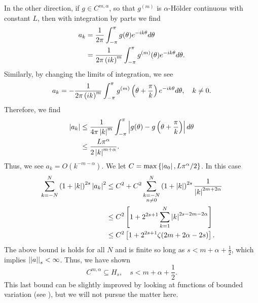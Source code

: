 In the other direction, if $g\in C^{m,\alpha}$, so that $g^{(m)}$
is $\alpha$-H\"{o}lder continuous with constant $L$, then
with integration by parts we find
%
\begin{align}
    a_{k} &= \frac{1}{2\pi}\int_{-\pi}^{\pi} g(\theta)e^{-ik\theta}d\theta
        \nonumber\\
    &= \frac{1}{2\pi\left( ik \right)^{m}}
        \int_{-\pi}^{\pi} g^{(m)}(\theta)e^{-ik\theta}d\theta.
\end{align}
%
Similarly, by changing the limits of integration, we see
%
\begin{equation}
    a_{k} = -\frac{1}{2\pi\left( ik \right)^{m}} \int_{-\pi}^{\pi}
        g^{(m)}\left( \theta+\frac{\pi}{k} \right)e^{-ik\theta}d\theta,
    \quad k\ne0.
\end{equation}
%
Therefore, we find
%
\begin{align}
    \left| a_{k} \right| &\le \frac{1}{4\pi\left| k \right|^{m}}\int_{-\pi}^{\pi}
        \left| g(\theta)-g\left( \theta+\frac{\pi}{k} \right) \right|d\theta \nonumber\\
    &\le \frac{L\pi^{\alpha}}{2\left| k \right|^{m+\alpha}}.
\end{align}
%
Thus, we see $a_{k} = O(k^{-m-\alpha})$.
We let $C = \max\left\{ \left| a_{0} \right|,L\pi^{\alpha}/2 \right\}$.
In this case
%
\begin{align}
    \sum_{k=-N}^{N} \left( 1+\left| k \right| \right)^{2s} \left| a_{k} \right|^{2}
        &\le C^{2} + C^{2}\sum_{\substack{k=-N\\n\ne0}}^{N}
            \left( 1+\left| k \right| \right)^{2s} \frac{1}{\left| k \right|^{2m+2\alpha}} \nonumber\\
    &\le C^{2}\left[ 1 + 2^{2s+1}\sum_{k=1}^{N} \left| k \right|^{2s-2m-2\alpha} \right]
        \nonumber\\
    &\le C^{2}\left[ 1 + 2^{2s+1}\zeta(2m+2\alpha-2s) \right].
\end{align}
%
The above bound is holds for all $N$ and is finite so long as
$s<m+\alpha+\frac{1}{2}$, which implies $\left| \left| a \right| \right|_{s} < \infty$.
Thus, we have shown
%
\begin{equation}
    C^{m,\alpha}\subseteq H_{s}, \quad s<m+\alpha+\frac{1}{2}.
\end{equation}
%
This last bound can be slightly improved by looking
at functions of bounded variation (see \cite{ATAP,zygmund}),
but we will not pursue the matter here.



